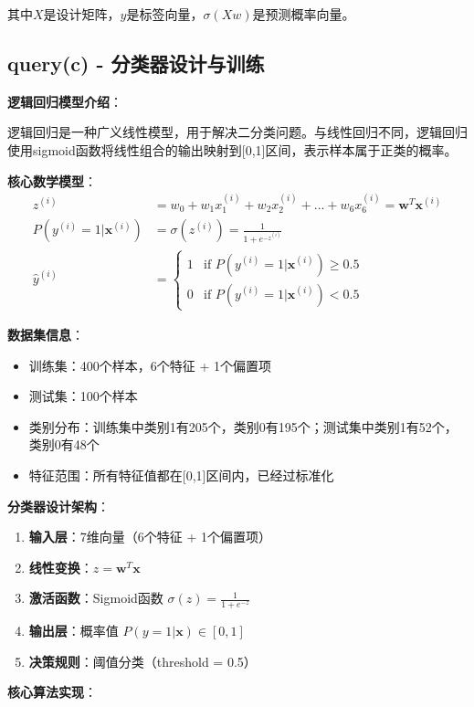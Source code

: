 \documentclass[a4paper]{article}
\begin{document}
其中$X$是设计矩阵，$y$是标签向量，$\sigma(Xw)$是预测概率向量。

\subsection{query(c) - 分类器设计与训练}

\textbf{逻辑回归模型介绍}：

逻辑回归是一种广义线性模型，用于解决二分类问题。与线性回归不同，逻辑回归使用sigmoid函数将线性组合的输出映射到[0,1]区间，表示样本属于正类的概率。

\textbf{核心数学模型}：
\begin{align}
z^{(i)} &= w_0 + w_1 x_1^{(i)} + w_2 x_2^{(i)} + ... + w_6 x_6^{(i)} = \mathbf{w}^T \mathbf{x}^{(i)} \\
P(y^{(i)} = 1 | \mathbf{x}^{(i)}) &= \sigma(z^{(i)}) = \frac{1}{1 + e^{-z^{(i)}}} \\
\hat{y}^{(i)} &= \begin{cases} 1 & \text{if } P(y^{(i)} = 1 | \mathbf{x}^{(i)}) \geq 0.5 \\ 0 & \text{if } P(y^{(i)} = 1 | \mathbf{x}^{(i)}) < 0.5 \end{cases}
\end{align}

\textbf{数据集信息}：
\begin{itemize}
    \item 训练集：400个样本，6个特征 + 1个偏置项
    \item 测试集：100个样本
    \item 类别分布：训练集中类别1有205个，类别0有195个；测试集中类别1有52个，类别0有48个
    \item 特征范围：所有特征值都在[0,1]区间内，已经过标准化
\end{itemize}

\textbf{分类器设计架构}：
\begin{enumerate}
    \item \textbf{输入层}：7维向量（6个特征 + 1个偏置项）
    \item \textbf{线性变换}：$z = \mathbf{w}^T \mathbf{x}$
    \item \textbf{激活函数}：Sigmoid函数 $\sigma(z) = \frac{1}{1+e^{-z}}$
    \item \textbf{输出层}：概率值 $P(y=1|\mathbf{x}) \in [0,1]$
    \item \textbf{决策规则}：阈值分类（threshold = 0.5）
\end{enumerate}

\textbf{核心算法实现}：
\end{document}
